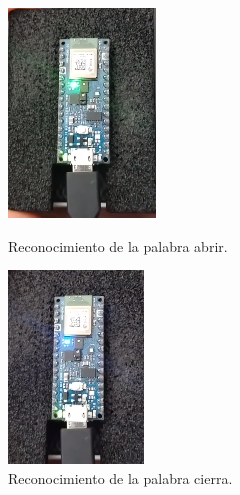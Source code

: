 \begin{figure}[H]
   \begin{minipage}{0.48\textwidth}
     \centering
    \includegraphics[width=.55\linewidth]{Img/abrir_1.png}
    \caption{Reconocimiento de la palabra abrir.}
    \label{abrir_1}
   \end{minipage}\hfill
   \begin{minipage}{0.48\textwidth}
     \centering
    \includegraphics[width=.55\linewidth]{Img/cierra_1.png}
    \caption{Reconocimiento de la palabra cierra.}
    \label{cierra_1}     
   \end{minipage}
\end{figure}
